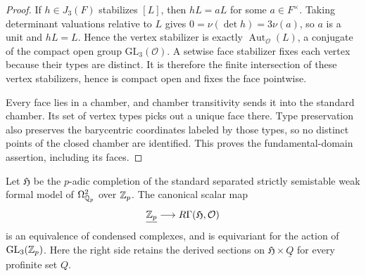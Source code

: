 \begin{proof}
If $h\in J_3(F)$ stabilizes $[L]$, then $hL=aL$ for some $a\in F^\times$.
Taking determinant valuations relative to $L$ gives
$0=\nu(\det h)=3\nu(a)$, so $a$ is a unit and $hL=L$.  Hence the vertex
stabilizer is exactly $\operatorname{Aut}_{\mathcal O}(L)$, a conjugate
of the compact open group $\mathrm{GL}_3(\mathcal O)$.  A setwise face
stabilizer fixes each vertex because their types are distinct.  It is
therefore the finite intersection of these vertex stabilizers, hence is
compact open and fixes the face pointwise.

Every face lies in a chamber, and chamber transitivity sends it into the
standard chamber.  Its set of vertex types picks out a unique face there.
Type preservation also preserves the barycentric coordinates labeled by
those types, so no distinct points of the closed chamber are identified.
This proves the fundamental-domain assertion, including its faces.
\end{proof}

\begin{lemma}
\label{h3:lem:drinfeld-structure-sheaf}
Let $\mathfrak H$ be the $p$-adic completion of the standard separated
strictly semistable weak formal model of $\Omega^2_{\mathbb Q_p}$ over $\mathbb Z_p$.
The canonical scalar map
\[
 \underline{\mathbb Z_p}\longrightarrow R\Gamma(\mathfrak H,\mathcal O)
\]
is an equivalence of condensed complexes, and is equivariant for the
action of $\operatorname{GL}_3(\mathbb Z_p)$.  Here the right side retains the derived
sections on $\mathfrak H\times\underline Q$ for every profinite set $Q$.
\end{lemma}


